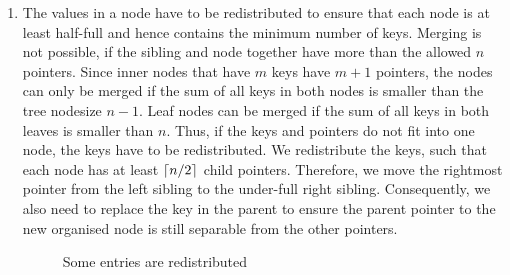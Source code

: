 \documentclass[abstracton,12pt]{scrreprt}
\DeclarePairedDelimiter\ceil{\lceil}{\rceil}
\begin{document}
\begin{enumerate}
	
	\item The values in a node have to be redistributed to ensure that each node is at least half-full and hence contains the minimum number of keys. Merging is not possible, if the sibling and node together have more than the allowed $n$ pointers. Since inner nodes that have $m$ keys have $m+1$ pointers, the nodes can only be merged if the sum of all keys in both nodes is smaller than the tree nodesize $n-1$. Leaf nodes can be merged if the sum of all keys in both leaves is smaller than $n$. Thus, if the keys and pointers do not fit into one node, the keys have to be redistributed. We redistribute the keys, such that each node has at least $\ceil{n/2}$ child pointers. Therefore, we move the rightmost pointer from the left sibling to the under-full right sibling. Consequently, we also need to replace the key in the parent to ensure the parent pointer to the new organised node is still separable from the other pointers.
		\begin{figure}[ht!]
			\centering
			\vspace{2mm}
			\caption{Some entries are redistributed}
			\label{fig:enoughkeys}
		\end{figure} 
	
	
\end{enumerate} 
\end{document}
